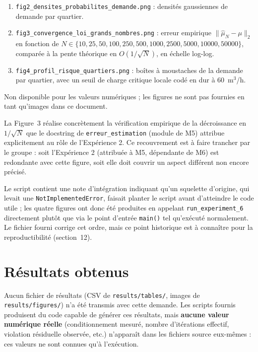 \documentclass[11pt,a4paper]{article}
\begin{document}
\begin{description}[style=nextline]
\begin{enumerate}
    corrélation $R$ et de covariance $\Sigma$ du modèle.
    \item \texttt{fig2\_densites\_probabilites\_demande.png} : densités
    gaussiennes de demande par quartier.
    \item \texttt{fig3\_convergence\_loi\_grands\_nombres.png} : erreur
    empirique $\lVert \hat\mu_N - \mu \rVert_2$ en fonction de $N \in
    \{10, 25, 50, 100, 250, 500, 1000, 2500, 5000, 10000, 50000\}$, comparée
    à la pente théorique en $O(1/\sqrt{N})$, en échelle log-log.
    \item \texttt{fig4\_profil\_risque\_quartiers.png} : boîtes à moustaches
    de la demande par quartier, avec un seuil de charge critique locale
    codé en dur à 60~m$^3$/h.
  \end{enumerate}
  \item[Interprétation] Non disponible pour les valeurs numériques ; les
  figures ne sont pas fournies en tant qu'images dans ce document.
  \item[Lien avec la théorie] La Figure~3 réalise concrètement la
  vérification empirique de la décroissance en $1/\sqrt{N}$ que le docstring
  de \texttt{erreur\_estimation} (module de M5) attribue explicitement au
  rôle de l'Expérience 2. Ce recouvrement est à faire trancher par le
  groupe : soit l'Expérience 2 (attribuée à M5, dépendante de M6) est
  redondante avec cette figure, soit elle doit couvrir un aspect différent
  non encore précisé.
  \item[Limites] Le script contient une note d'intégration indiquant qu'un
  squelette d'origine, qui levait une \texttt{NotImplementedError}, faisait
  planter le script avant d'atteindre le code utile ; les quatre figures
  ont donc été produites en appelant \texttt{run\_experiment\_6} directement
  plutôt que via le point d'entrée \texttt{main()} tel qu'exécuté
  normalement. Le fichier fourni corrige cet ordre, mais ce point historique
  est à connaître pour la reproductibilité (section~12).
\end{description}

\section{Résultats obtenus}

Aucun fichier de résultats (CSV de \texttt{results/tables/}, images de
\texttt{results/figures/}) n'a été transmis avec cette demande. Les scripts
fournis produisent du code capable de générer ces résultats, mais
\textbf{aucune valeur numérique réelle} (conditionnement mesuré, nombre
d'itérations effectif, violation résiduelle observée, etc.) n'apparaît dans
les fichiers source eux-mêmes : ces valeurs ne sont connues qu'à l'exécution.
\end{document}
